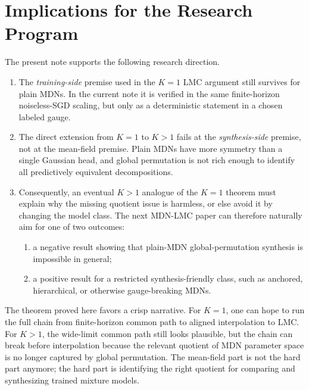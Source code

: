 \documentclass[11pt]{article}
\theoremstyle{definition}
\begin{document}
\section{Implications for the Research Program}

The present note supports the following research direction.

\begin{enumerate}[label=(\roman*)]
  \item The \emph{training-side} premise used in the $K=1$ LMC argument still
  survives for plain MDNs. In the current note it is verified in the same
  finite-horizon noiseless-SGD scaling, but only as a deterministic statement
  in a chosen labeled gauge.
  \item The direct extension from $K=1$ to $K>1$ fails at the
  \emph{synthesis-side} premise, not at the mean-field premise. Plain MDNs have
  more symmetry than a single Gaussian head, and global permutation is not rich
  enough to identify all predictively equivalent decompositions.
  \item Consequently, an eventual $K>1$ analogue of the $K=1$ theorem must
  explain why the missing quotient issue is harmless, or else avoid it by
  changing the model class. The next MDN-LMC paper can therefore naturally aim
  for one of two outcomes:
  \begin{enumerate}[label=(\alph*)]
    \item a negative result showing that plain-MDN global-permutation synthesis
    is impossible in general;
    \item a positive result for a restricted synthesis-friendly class, such as
    anchored, hierarchical, or otherwise gauge-breaking MDNs.
  \end{enumerate}
\end{enumerate}

The theorem proved here favors a crisp narrative. For $K=1$, one can hope to
run the full chain from finite-horizon common path to aligned interpolation to
LMC. For $K>1$, the wide-limit common path still looks plausible, but the chain
can break before interpolation because the relevant quotient of MDN parameter
space is no longer captured by global permutation. The mean-field part is not
the hard part anymore; the hard part is identifying the right quotient for
comparing and synthesizing trained mixture models.
\end{document}
